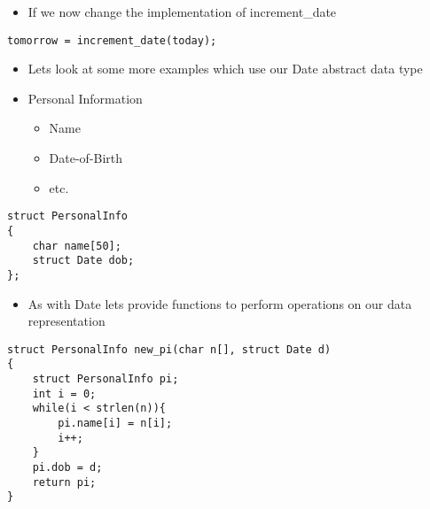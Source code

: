 \documentclass{beamer}
\begin{document}
\begin{frame}[fragile]
\begin{itemize}
\item If we now change the implementation of increment\_date
\end{itemize}
\begin{block}{}
\begin{lstlisting}
tomorrow = increment_date(today);
\end{lstlisting}
\end{block}
\end{frame}

\begin{frame}
\begin{itemize}
\item Lets look at some more examples which use our Date abstract data type
\bigskip
\item Personal Information
\begin{itemize}
\item Name
\item Date-of-Birth
\item etc.
\end{itemize}
\end{itemize}
\end{frame}

\begin{frame}[fragile]
\begin{block}{}
\begin{lstlisting}
struct PersonalInfo
{
    char name[50];
    struct Date dob;
};
\end{lstlisting}
\end{block}
\end{frame}

\begin{frame}
\begin{itemize}
\item As with Date lets provide functions to perform operations on our data representation
\end{itemize}
\end{frame}

\begin{frame}[fragile]
\begin{block}{}
\begin{lstlisting}
struct PersonalInfo new_pi(char n[], struct Date d)
{
    struct PersonalInfo pi;
    int i = 0;
    while(i < strlen(n)){
        pi.name[i] = n[i];
        i++;
    }
    pi.dob = d;
    return pi;
}
\end{lstlisting}
\end{block}
\end{frame}
\end{document}
